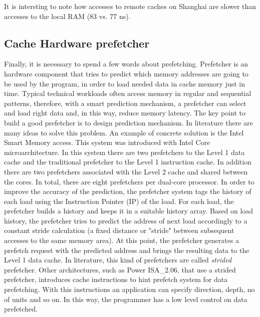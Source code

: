 It is intersting to note how  accesses to remote caches on Shanghai are slower than accesses to the local RAM (83 vs. 77 ns). 

\subsection{Cache Hardware prefetcher}

Finally, it is necessary to spend a few words about prefetching. Prefetcher is an hardware component that tries to predict which memory addresses are
going to be used by the program, in order to load needed data in cache memory just in time.
Typical technical workloads often access memory in regular and sequential patterns, therefore, with a smart prediction mechanism, a prefetcher can select 
and load right data and, in this way, reduce memory latency. The key point to build a good prefetcher is to design prediction mechanism.
In literature there are many ideas to solve this problem. An example of concrete solution is the Intel Smart Memory access. This system was introduced
with Intel Core microarchitecture. In this system there are two prefetchers to the Level 1 data cache and the traditional prefetcher to the Level 1 
instruction cache. In addition there are two prefetchers associated with the Level 2 cache and shared between the cores. In total, there are eight
prefetchers per dual-core processor. 
In order to improve the accuracy of the prediction, the prefetcher system tags the history of each load using the Instruction Pointer (IP) of the load. 
For each load, the prefetcher builds a history and keeps it in a suitable history array. Based on load history, the prefetcher tries to predict the 
address of next load accordingly to a constant stride calculation (a fixed distance or "stride" between subsequent accesses to the same memory area). 
At this point, the prefetcher generates a prefetch request with the predicted address and brings the resulting data to the Level 1 data cache.
In literature, this kind of prefetchers are called \textit{strided} prefetcher.
Other architectures, such as Power ISA\_2.06, that use a strided prefetcher, introduces cache instructions to hint prefetch system for data prefetching.
With this instructions an application can specify direction, depth, no of units and so on. In this way, the programmer has a low level control on 
data prefetched.

